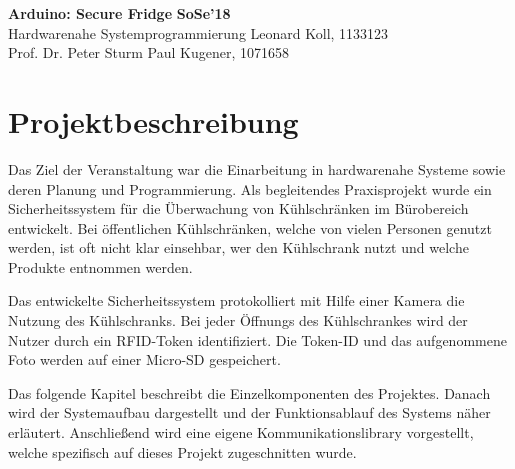 \documentclass[a4paper, 11pt]{article}
\begin{document}
\noindent
\large\textbf{Arduino: Secure Fridge} \hfill \textbf{SoSe'18} \\
\normalsize Hardwarenahe Systemprogrammierung \hfill Leonard Koll, 1133123 \\
Prof. Dr. Peter Sturm \hfill Paul Kugener, 1071658

\section{Projektbeschreibung}
Das Ziel der Veranstaltung war die Einarbeitung in hardwarenahe Systeme sowie deren Planung und Programmierung. Als begleitendes Praxisprojekt wurde ein Sicherheitssystem für die Überwachung von Kühlschränken im Bürobereich entwickelt. Bei öffentlichen Kühlschränken, welche von vielen Personen genutzt werden, ist oft nicht klar einsehbar, wer den Kühlschrank nutzt und welche Produkte entnommen werden.

Das entwickelte Sicherheitssystem protokolliert mit Hilfe einer Kamera die Nutzung des Kühlschranks. Bei jeder Öffnungs des Kühlschrankes wird der Nutzer durch ein RFID-Token identifiziert. Die Token-ID und das aufgenommene Foto werden auf einer Micro-SD gespeichert.

Das folgende Kapitel beschreibt die Einzelkomponenten des Projektes. Danach wird der Systemaufbau dargestellt und der Funktionsablauf des Systems näher erläutert. Anschließend wird eine eigene Kommunikationslibrary vorgestellt, welche spezifisch auf dieses Projekt zugeschnitten wurde.
\end{document}

